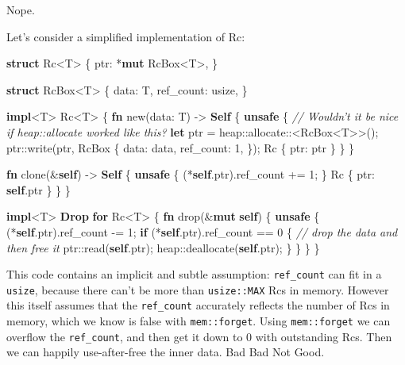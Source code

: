 \documentclass[a4paper,]{book}
\newenvironment{Shaded}{\begin{snugshade}}{\end{snugshade}}
\newcommand{\KeywordTok}[1]{\textcolor[rgb]{0.13,0.29,0.53}{\textbf{{#1}}}}
\newcommand{\DecValTok}[1]{\textcolor[rgb]{0.00,0.00,0.81}{{#1}}}
\newcommand{\CommentTok}[1]{\textcolor[rgb]{0.56,0.35,0.01}{\textit{{#1}}}}
\newcommand{\NormalTok}[1]{{#1}}
\begin{document}
Nope.

Let's consider a simplified implementation of Rc:

\begin{Shaded}
\begin{Highlighting}[]
\KeywordTok{struct} \NormalTok{Rc<T> \{}
    \NormalTok{ptr: *}\KeywordTok{mut} \NormalTok{RcBox<T>,}
\NormalTok{\}}

\KeywordTok{struct} \NormalTok{RcBox<T> \{}
    \NormalTok{data: T,}
    \NormalTok{ref_count: usize,}
\NormalTok{\}}

\KeywordTok{impl}\NormalTok{<T> Rc<T> \{}
    \KeywordTok{fn} \NormalTok{new(data: T) -> }\KeywordTok{Self} \NormalTok{\{}
        \KeywordTok{unsafe} \NormalTok{\{}
            \CommentTok{// Wouldn't it be nice if heap::allocate worked like this?}
            \KeywordTok{let} \NormalTok{ptr = heap::allocate::<RcBox<T>>();}
            \NormalTok{ptr::write(ptr, RcBox \{}
                \NormalTok{data: data,}
                \NormalTok{ref_count: }\DecValTok{1}\NormalTok{,}
            \NormalTok{\});}
            \NormalTok{Rc \{ ptr: ptr \}}
        \NormalTok{\}}
    \NormalTok{\}}

    \KeywordTok{fn} \NormalTok{clone(&}\KeywordTok{self}\NormalTok{) -> }\KeywordTok{Self} \NormalTok{\{}
        \KeywordTok{unsafe} \NormalTok{\{}
            \NormalTok{(*}\KeywordTok{self}\NormalTok{.ptr).ref_count += }\DecValTok{1}\NormalTok{;}
        \NormalTok{\}}
        \NormalTok{Rc \{ ptr: }\KeywordTok{self}\NormalTok{.ptr \}}
    \NormalTok{\}}
\NormalTok{\}}

\KeywordTok{impl}\NormalTok{<T> }\KeywordTok{Drop} \KeywordTok{for} \NormalTok{Rc<T> \{}
    \KeywordTok{fn} \NormalTok{drop(&}\KeywordTok{mut} \KeywordTok{self}\NormalTok{) \{}
        \KeywordTok{unsafe} \NormalTok{\{}
            \NormalTok{(*}\KeywordTok{self}\NormalTok{.ptr).ref_count -= }\DecValTok{1}\NormalTok{;}
            \KeywordTok{if} \NormalTok{(*}\KeywordTok{self}\NormalTok{.ptr).ref_count == }\DecValTok{0} \NormalTok{\{}
                \CommentTok{// drop the data and then free it}
                \NormalTok{ptr::read(}\KeywordTok{self}\NormalTok{.ptr);}
                \NormalTok{heap::deallocate(}\KeywordTok{self}\NormalTok{.ptr);}
            \NormalTok{\}}
        \NormalTok{\}}
    \NormalTok{\}}
\NormalTok{\}}
\end{Highlighting}
\end{Shaded}

This code contains an implicit and subtle assumption:
\texttt{ref\_count} can fit in a \texttt{usize}, because there can't be
more than \texttt{usize::MAX} Rcs in memory. However this itself assumes
that the \texttt{ref\_count} accurately reflects the number of Rcs in
memory, which we know is false with \texttt{mem::forget}. Using
\texttt{mem::forget} we can overflow the \texttt{ref\_count}, and then
get it down to 0 with outstanding Rcs. Then we can happily
use-after-free the inner data. Bad Bad Not Good.
\end{document}
